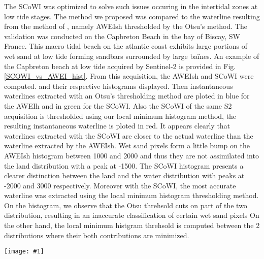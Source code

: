 \documentclass[remotesensing,article,submit,pdftex,moreauthors]{Definitions/mdpi}
\newcommand{\myfigure}[4]{
    \begin{figure*}[h!]
        \centering
        \texttt{[image: \#1]}	 
        \caption{\itshape#2}
        \label{#3}
    \end{figure*} 
}
\begin{document}
The SCoWI was optimized to solve such issues occuring in the intertidal zones at low tide stages. 
The method we proposed was compared to the waterline resulting from the method of \citep{Bishop_sub_pixel}, namely AWEIsh thresholded by the Otsu's method.
The validation was conducted on the Capbreton Beach in the bay of Biscay, SW France.
This macro-tidal beach on the atlantic coast exhibits large portions of wet sand at low tide forming sandbars surrounded by large baïnes.
An example of the Capbreton beach at low tide acquired by Sentinel-2 is provided in Fig.\ref{SCOWI_vs_AWEI_hist}.
From this acquisition, the AWEIsh and SCoWI were computed.
and their respective histograms displayed.
Then instantaneous waterlines extracted with an Otsu's thresholding method are ploted in blue for the AWEIh and in green for the SCoWI.
Also the SCoWI of the same S2 acquisition is thresholded using our local minimum histogram method, the resulting instantaneous waterline is ploted in red.
It appears clearly that waterlines extracted with the SCoWI are closer to the actual waterline than the waterline extracted by the AWEIsh.
Wet sand pixels form a little bump on the AWEIsh histogram between 1000 and 2000 and thus they are not assimilated into the land distribution with a peak at -1500.
The SCoWI histogram presents a clearer distinction between the land and the water distribution with peaks at -2000 and 3000 respectively.
Moreover with the SCoWI, the most accurate waterline was extracted using the local minimum histogram thresholding method.
On the histogram, we observe that the Otsu threhsold cuts on part of the two distribution, resulting in an inaccurate classification of certain wet sand pixels 
On the other hand, the local minimum histgram threhsold is computed between the 2 distributions where their both contributions are minimized.

\myfigure{img/AWEIsh_vs_SCOWI2.png}{a) Sentinel-2 acquisition of Capbreton beach at low tide. Instantaneous waterlines extracted by the 3 methods compared are displayed in plain lines. Waterline extracted by the SCoWI combined to the local minimum histogram thresholding method (red line) is the closest to the actual waterline on the acquisition. b) AWEIsh histogram of this S2 acquisition. The dashed blue line is located at the Otsu's threhsold value computed for this histogram. c) SCoWI histogram of this S2 acquisition. The dashed green line is located at the Otsu's threhsold value computed for this histogram. The dashed red line is located at the local minimum histogram threhsold value computed for this histogram.}{SCOWI_vs_AWEI_hist}{1}
\end{document}
